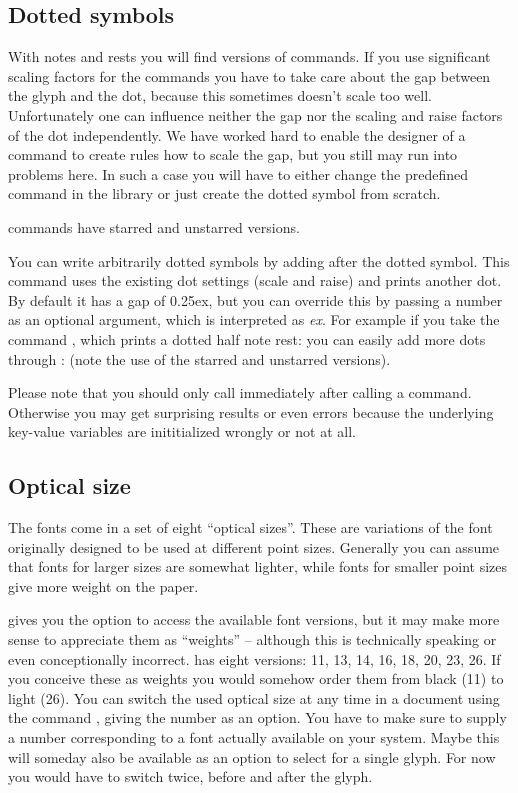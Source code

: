 \documentclass{article}
\begin{document}
\subsection{Dotted symbols}
\label{subsec:dotted_symbols}
With notes and rests you will find  versions of commands.
If you use significant scaling factors for the commands you have to take care about the gap between the glyph and the dot, because this sometimes doesn't scale too well.
Unfortunately one can influence neither the gap nor the scaling and raise factors of the dot independently.
We have worked hard to enable the designer of a command to create rules how to scale the gap, but you still may run into problems here. 
In such a case you will have to either change the predefined command in the library or just create the dotted symbol from scratch.

 commands have starred and unstarred versions.

You can write arbitrarily dotted symbols by adding  after the dotted symbol. 
This command uses the existing dot settings (scale and raise) and prints another dot. 
By default it has a gap of 0.25ex, but you can override this by passing a number as an optional argument, which is interpreted as \emph{ex}.
For example if you take the command , which prints a dotted half note rest: \halfNoteRestDotted  you can easily add more dots through : \halfNoteRestDotted*\lilyPrintMoreDots (note the use of the starred and unstarred versions).

Please note that you should only call  immediately after calling a  command. Otherwise you may get surprising results or even errors because the underlying key-value variables are inititialized wrongly or not at all.

\subsection{Optical size}
\label{subsec:optical_size}
The \emmentaler fonts come in a set of eight \enquote{optical sizes}.
These are variations of the font originally designed to be used at different point sizes.
Generally you can assume that fonts for larger sizes are somewhat lighter, while fonts for smaller point sizes give more weight on the paper.

\lilyglyphs gives you the option to access the available font versions, but it may make more sense to appreciate them as \enquote{weights} -- although this is technically speaking or even conceptionally incorrect.
\emmentaler has eight versions: 11, 13, 14, 16, 18, 20, 23, 26. 
If you conceive these as weights you would somehow order them from black (11) to light (26).
You can switch the used optical size at any time in a document using the command , giving the number as an option. 
You have to make sure to supply a number corresponding to a font actually available on your system.
Maybe this will someday also be available as an option to select for a single glyph.
For now you would have to switch twice, before and after the glyph.
\end{document}
